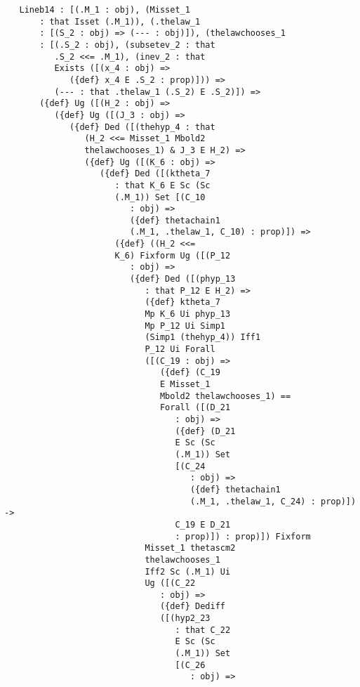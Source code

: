 \documentclass[12pt]{article}
\begin{document}
\begin{verbatim}
   Lineb14 : [(.M_1 : obj), (Misset_1 
       : that Isset (.M_1)), (.thelaw_1 
       : [(S_2 : obj) => (--- : obj)]), (thelawchooses_1 
       : [(.S_2 : obj), (subsetev_2 : that 
          .S_2 <<= .M_1), (inev_2 : that 
          Exists ([(x_4 : obj) => 
             ({def} x_4 E .S_2 : prop)])) => 
          (--- : that .thelaw_1 (.S_2) E .S_2)]) => 
       ({def} Ug ([(H_2 : obj) => 
          ({def} Ug ([(J_3 : obj) => 
             ({def} Ded ([(thehyp_4 : that 
                (H_2 <<= Misset_1 Mbold2 
                thelawchooses_1) & J_3 E H_2) => 
                ({def} Ug ([(K_6 : obj) => 
                   ({def} Ded ([(ktheta_7 
                      : that K_6 E Sc (Sc 
                      (.M_1)) Set [(C_10 
                         : obj) => 
                         ({def} thetachain1 
                         (.M_1, .thelaw_1, C_10) : prop)]) => 
                      ({def} ((H_2 <<= 
                      K_6) Fixform Ug ([(P_12 
                         : obj) => 
                         ({def} Ded ([(phyp_13 
                            : that P_12 E H_2) => 
                            ({def} ktheta_7 
                            Mp K_6 Ui phyp_13 
                            Mp P_12 Ui Simp1 
                            (Simp1 (thehyp_4)) Iff1 
                            P_12 Ui Forall 
                            ([(C_19 : obj) => 
                               ({def} (C_19 
                               E Misset_1 
                               Mbold2 thelawchooses_1) == 
                               Forall ([(D_21 
                                  : obj) => 
                                  ({def} (D_21 
                                  E Sc (Sc 
                                  (.M_1)) Set 
                                  [(C_24 
                                     : obj) => 
                                     ({def} thetachain1 
                                     (.M_1, .thelaw_1, C_24) : prop)]) -> 
                                  C_19 E D_21 
                                  : prop)]) : prop)]) Fixform 
                            Misset_1 thetascm2 
                            thelawchooses_1 
                            Iff2 Sc (.M_1) Ui 
                            Ug ([(C_22 
                               : obj) => 
                               ({def} Dediff 
                               ([(hyp2_23 
                                  : that C_22 
                                  E Sc (Sc 
                                  (.M_1)) Set 
                                  [(C_26 
                                     : obj) => 

\end{verbatim}
\end{document}
